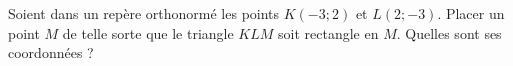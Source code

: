 
\begin{exercice}\label{exosmath-0482}

Soient dans un repère orthonormé les points \( K(-3;2)\) et \( L(2;-3)\). Placer un point \( M\) de telle sorte que le triangle \( KLM\) soit rectangle en \( M\). Quelles sont ses coordonnées ?

\end{exercice}
